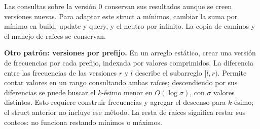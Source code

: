 Las consultas sobre la versi\'on 0 conservan sus resultados aunque se
creen versiones nuevas. Para adaptar este struct a m\'inimos, cambiar la
suma por m\'inimo en build, update y query, y el neutro por infinito.
La copia de caminos y el manejo de ra\'ices se conservan.

\textbf{Otro patr\'on: versiones por prefijo.} En un arreglo est\'atico,
crear una versi\'on de frecuencias por cada prefijo, indexada por valores
comprimidos. La diferencia entre las frecuencias de las versiones $r$ y
$l$ describe el subarreglo $[l,r)$. Permite contar valores en un rango
consultando ambas ra\'ices; descendiendo por sus diferencias se puede
buscar el $k$-\'esimo menor en $O(\log \sigma)$, con $\sigma$ valores distintos.
Esto requiere construir frecuencias y agregar el descenso para $k$-\'esimo;
el struct anterior no incluye ese m\'etodo. La resta de ra\'ices significa
restar sus conteos: no funciona restando m\'inimos o m\'aximos.
